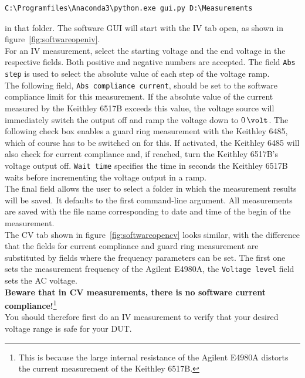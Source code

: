 \documentclass[a4paper]{article}
\begin{document}
\begin{lstlisting}
C:\Programfiles\Anaconda3\python.exe gui.py D:\Measurements
\end{lstlisting}

in that folder.
The software GUI will start with the IV tab open, as shown in figure~\ref{fig:softwareopeniv}.\\

For an IV measurement, select the starting voltage and the end voltage in the respective fields.
Both positive and negative numbers are accepted.
The field {\tt Abs step} is used to select the absolute value of each step of the voltage ramp.\\

The following field, {\tt Abs compliance current}, should be set to the software compliance limit for this measurement.
If the absolute value of the current measured by the Keithley 6517B exceeds this value, the voltage source will immediately switch the output off and ramp the voltage down to $0\,\volt$.
The following check box enables a guard ring measurement with the Keithley 6485, which of course has to be switched on for this.
If activated, the Keithley 6485 will also check for current compliance and, if reached, turn the Keithley 6517B's voltage output off.
{\tt Wait time} specifies the time in seconds the Keithley 6517B waits before incrementing the voltage output in a ramp.\\

The final field allows the user to select a folder in which the measurement results will be saved.
It defaults to the first command-line argument.
All measurements are saved with the file name corresponding to date and time of the begin of the measurement.\\

The CV tab shown in figure~\ref{fig:softwareopencv} looks similar, with the difference that the fields for current compliance and guard ring measurement are substituted by fields where the frequency parameters can be set.
The first one sets the measurement frequency of the Agilent E4980A, the {\tt Voltage level} field sets the AC voltage.\\

{\bf Beware that in CV measurements, there is no software current compliance!}\footnote{This is because the large internal resistance of the Agilent E4980A distorts the current measurement of the Keithley 6517B.}\\

You should therefore first do an IV measurement to verify that your desired voltage range is safe for your DUT.\\
\end{document}
